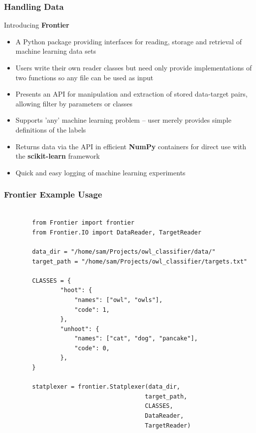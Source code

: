 \documentclass{beamer}
\begin{document}
\begin{frame}[t]
\frametitle{Handling Data}
    \begin{beamerboxesrounded}[shadow=true]{}
        \begin{center}
            Introducing \textbf{Frontier}
        \end{center}
    \end{beamerboxesrounded}
    \begin{itemize}
        \item A Python package providing interfaces for reading, storage and
            retrieval of machine learning data sets
        \item Users write their own reader classes but need only provide
            implementations of two functions so any file can be used as input
        \item Presents an API for manipulation and extraction of stored
            data-target pairs, allowing filter by parameters or classes
        \item Supports 'any' machine learning problem -- user merely provides
            simple definitions of the labels
        \item Returns data via the API in efficient \textbf{NumPy} containers
            for direct use with the \textbf{scikit-learn} framework
        \item Quick and easy logging of machine learning experiments
    \end{itemize}
\end{frame}


\begin{frame}[fragile]
\frametitle{Frontier Example Usage}
    \begin{verbatim}

        from Frontier import frontier
        from Frontier.IO import DataReader, TargetReader

        data_dir = "/home/sam/Projects/owl_classifier/data/"
        target_path = "/home/sam/Projects/owl_classifier/targets.txt"

        CLASSES = {
                "hoot": {
                    "names": ["owl", "owls"],
                    "code": 1,
                },
                "unhoot": {
                    "names": ["cat", "dog", "pancake"],
                    "code": 0,
                },
        }

        statplexer = frontier.Statplexer(data_dir,
                                        target_path,
                                        CLASSES,
                                        DataReader,
                                        TargetReader)
    \end{verbatim}
\end{frame}
\end{document}
